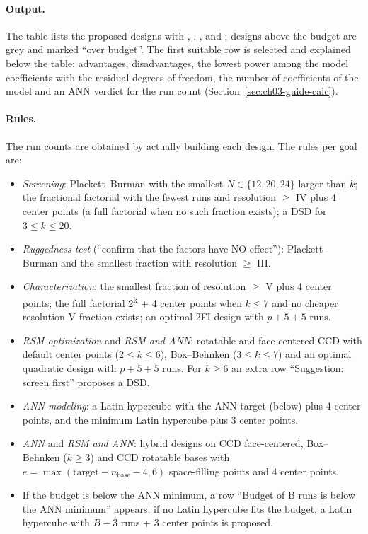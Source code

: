 \paragraph{Output.} The table lists the proposed designs with , , ,
 and ; designs above the budget are grey and marked ``over budget''. The
first suitable row is selected and explained below the table: advantages, disadvantages, the lowest power among the
model coefficients with the residual degrees of freedom, the number of coefficients of the model and an ANN verdict
for the run count (Section~\ref{sec:ch03-guide-calc}).

\paragraph{Rules.} The run counts are obtained by actually building each design. The rules per goal are:
\begin{itemize}
\item \emph{Screening}: Plackett--Burman with the smallest $N \in \{12, 20, 24\}$ larger than $k$; the fractional
factorial with the fewest runs and resolution $\ge$ IV plus 4 center points (a full factorial when no such fraction
exists); a DSD for $3 \le k \le 20$.
\item \emph{Ruggedness test} (``confirm that the factors have NO effect''): Plackett--Burman and the smallest
fraction with resolution $\ge$ III.
\item \emph{Characterization}: the smallest fraction of resolution $\ge$ V plus 4 center points; the full factorial
2\textsuperscript{k} + 4 center points when $k \le 7$ and no cheaper resolution V fraction exists; an optimal 2FI
design with $p + 5 + 5$ runs.
\item \emph{RSM optimization} and \emph{RSM and ANN}: rotatable and face-centered CCD with default center points
($2 \le k \le 6$), Box--Behnken ($3 \le k \le 7$) and an optimal quadratic design with $p + 5 + 5$ runs. For
$k \ge 6$ an extra row ``Suggestion: screen first'' proposes a DSD.
\item \emph{ANN modeling}: a Latin hypercube with the ANN target (below) plus 4 center points, and the minimum
Latin hypercube plus 3 center points.
\item \emph{ANN} and \emph{RSM and ANN}: hybrid designs on CCD face-centered, Box--Behnken ($k\ge 3$) and CCD
rotatable bases with $e = \max(\text{target} - n_{\text{base}} - 4, 6)$ space-filling points and 4 center points.
\item If the budget is below the ANN minimum, a row ``Budget of B runs is below the ANN minimum'' appears; if no
Latin hypercube fits the budget, a Latin hypercube with $B - 3$ runs + 3 center points is proposed.
\end{itemize}

